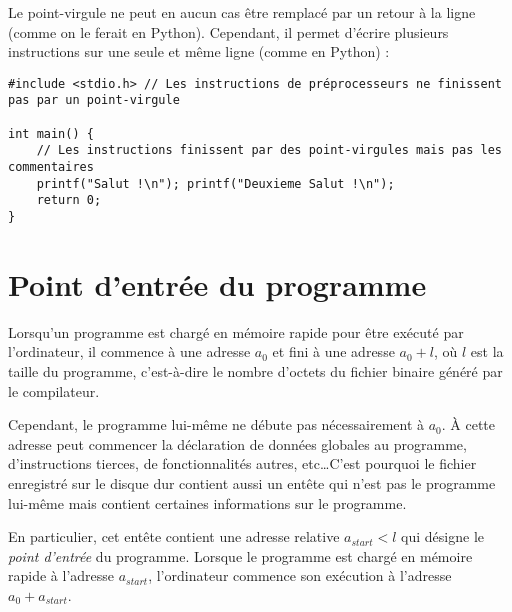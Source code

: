 \documentclass[../../../main.tex]{subfiles}
\begin{document}
Le point-virgule ne peut en aucun cas être remplacé par un retour à la ligne (comme on le ferait en Python). Cependant, il permet d'écrire plusieurs instructions sur une seule et même ligne (comme en Python) :
\begin{verbatim}
#include <stdio.h> // Les instructions de préprocesseurs ne finissent pas par un point-virgule

int main() {
	// Les instructions finissent par des point-virgules mais pas les commentaires
	printf("Salut !\n"); printf("Deuxieme Salut !\n"); 
	return 0;
}
\end{verbatim}
\section{Point d'entrée du programme}
Lorsqu'un programme est chargé en mémoire rapide pour être exécuté par l'ordinateur, il commence à une adresse $a_{0}$ et fini à une adresse $a_{0} + l$, où $l$ est la taille du programme, c'est-à-dire le nombre d'octets du fichier binaire généré par le compilateur.
 
Cependant, le programme lui-même ne débute pas nécessairement à $a_{0}$. À cette adresse peut commencer la déclaration de données globales au programme, d'instructions tierces, de fonctionnalités autres, etc\dots C'est pourquoi le fichier enregistré sur le disque dur contient aussi un entête qui n'est pas le programme lui-même mais contient certaines informations sur le programme.
 
En particulier, cet entête contient une adresse relative $a_{start} < l$ qui désigne le \textit{point d'entrée} du programme. Lorsque le programme est chargé en mémoire rapide à l'adresse $a_{start}$, l'ordinateur commence son exécution à l'adresse $a_{0} + a_{start}$.
 
\end{document}
